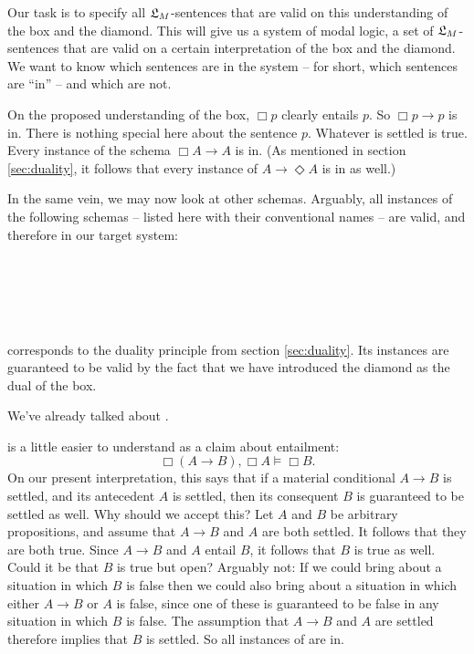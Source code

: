 
Our task is to specify all $\mathfrak{L}_{M}$-sentences that are valid on this
understanding of the box and the diamond. This will give us a system of modal
logic, a set of $\mathfrak{L}_{M}$-sentences that are valid on a certain interpretation of
the box and the diamond. We want to know which sentences are in the system --
for short, which sentences are ``in'' -- and which are not.

On the proposed understanding of the box, $\Box p$ clearly entails $p$. So
$\Box p \to p$ is in. There is nothing special here about the sentence $p$.
Whatever is settled is true. Every instance of the schema $\Box A \to A$ is in.
(As mentioned in section \ref{sec:duality}, it follows that every instance of
$A \to \Diamond A$ is in as well.)

In the same vein, we may now look at other schemas. Arguably, all instances of
the following schemas -- listed here with their conventional names -- are valid,
and therefore in our target system:
%
\begin{principles}
  \\
  \\
  \\
  \\
\end{principles}

 corresponds to the duality principle  from section
\ref{sec:duality}. Its instances are guaranteed to be valid by the fact that we
have introduced the diamond as the dual of the box.

We've already talked about .

 is a little easier to understand as a claim about entailment:
\[
  \Box(A \to B), \Box A \models \Box B.
\]
On our present interpretation, this says that if a material conditional $A\to B$
is settled, and its antecedent $A$ is settled, then its consequent $B$ is
guaranteed to be settled as well. Why should we accept this? Let $A$ and
$B$ be arbitrary propositions, and assume that $A\to B$ and $A$ are both
settled. It follows that they are both true. Since $A\to B$ and $A$ entail $B$,
it follows that $B$ is true as well. Could it be that $B$ is true but open?
Arguably not: If we could bring about a situation in which $B$ is false then we
could also bring about a situation in which either $A\to B$ or $A$ is false,
since one of these is guaranteed to be false in any situation in which $B$ is
false. The assumption that $A\to B$ and $A$ are settled therefore implies that
$B$ is settled. So all instances of  are in.

